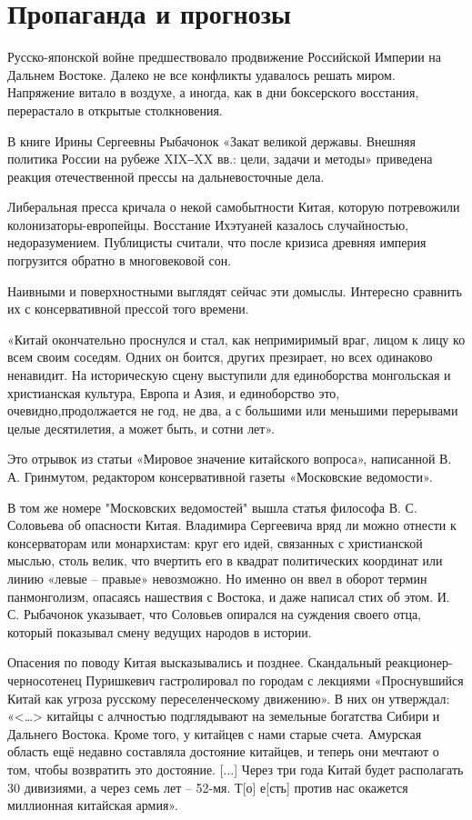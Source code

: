 
\chapter{Пропаганда и прогнозы}
Русско-японской войне предшествовало продвижение Российской Империи на Дальнем Востоке. Далеко не все конфликты удавалось решать миром. Напряжение витало в воздухе, а иногда, как в дни боксерского восстания, перерастало в открытые столкновения.

В книге Ирины Сергеевны Рыбачонок «Закат великой державы. Внешняя политика России на рубеже XIX‒XX вв.: цели, задачи и методы» приведена реакция отечественной прессы на дальневосточные дела.

Либеральная пресса кричала о некой самобытности Китая, которую потревожили колонизаторы-европейцы. Восстание Ихэтуаней казалось случайностью, недоразумением. Публицисты считали, что после кризиса древняя империя погрузится обратно в многовековой сон.

Наивными и поверхностными выглядят сейчас эти домыслы. Интересно сравнить их с консервативной прессой того времени.

«Китай окончательно проснулся и стал, как непримиримый враг, лицом к лицу ко всем своим соседям. Одних он боится, других презирает, но всех одинаково ненавидит. На историческую сцену выступили для единоборства монгольская и христианская культура, Европа и Азия, и единоборство это, очевидно,продолжается не год, не два, а с большими или меньшими перерывами целые десятилетия, а может быть, и сотни лет».

Это отрывок из статьи «Мировое значение китайского вопроса», написанной В. А. Гринмутом, редактором консервативной газеты «Московские ведомости».

В том же номере "Московских ведомостей" вышла статья философа В. С. Соловьева об опасности Китая. Владимира Сергеевича вряд ли можно отнести к консерваторам или монархистам: круг его идей, связанных с христианской мыслью, столь велик, что вчертить его в квадрат политических координат или линию «левые – правые» невозможно. Но именно он ввел в оборот термин панмонголизм, опасаясь нашествия с Востока, и даже написал стих об этом. И. С. Рыбачонок указывает, что Соловьев опирался на суждения своего отца, который показывал смену ведущих народов в истории.

Опасения по поводу Китая высказывались и позднее. Скандальный реакционер-черносотенец Пуришкевич гастролировал по городам с лекциями «Проснувшийся Китай как угроза русскому переселенческому движению». В них он утверждал: «<…> китайцы с алчностью подглядывают на земельные богатства Сибири и Дальнего Востока. Кроме того, у китайцев с нами старые счета. Амурская область ещё недавно составляла достояние китайцев, и теперь они мечтают о том, чтобы возвратить это достояние. [...] Через три года Китай будет располагать 30 дивизиями, а через семь лет – 52-мя. Т[о] е[сть] против нас окажется миллионная китайская армия».

